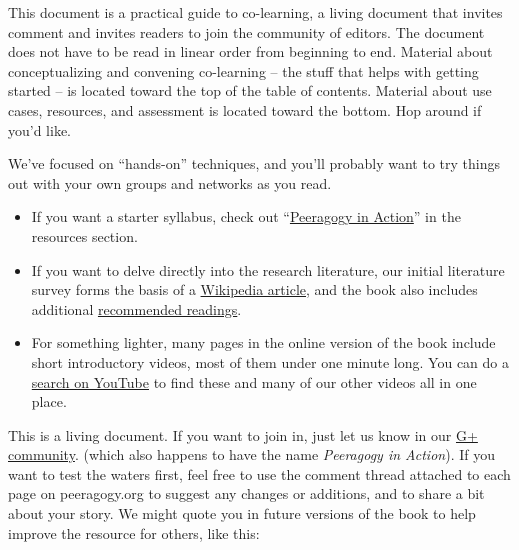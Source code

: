 This document is a practical guide to co-learning, a living document
that invites comment and invites readers to join the community of
editors. The document does not have to be read in linear order from
beginning to end. Material about conceptualizing and convening
co-learning -- the stuff that helps with getting started -- is located
toward the top of the table of contents. Material about use cases,
resources, and assessment is located toward the bottom. Hop around if
you'd like.

We've focused on ``hands-on'' techniques, and you'll probably want to
try things out with your own groups and networks as you read.

\begin{itemize}
\item
  If you want a starter syllabus, check out
  “\href{http://peeragogy.org/peeragogy-in-action/}{Peeragogy in
  Action}” in the resources section.
\item
  If you want to delve directly into the research literature, our
  initial literature survey forms the basis of a
  \href{https://en.wikipedia.org/wiki/Peer\_learning}{Wikipedia
  article}, and the book also includes additional
  \href{http://peeragogy.org/recommended-reading/}{recommended
  readings}.
\item
  For something lighter, many pages in the online version of the book
  include short introductory videos, most of them under one minute long.
  You can do a
  \href{http://www.youtube.com/results?search\_query=peeragogy\&sm=3}{search
  on YouTube} to find these and many of our other videos all in one
  place.
\end{itemize}
This is a living document. If you want to join in, just let us know in
our \href{https://plus.google.com/communities/107386162349686249470}{G+
community}. (which also happens to have the name \emph{Peeragogy in
Action}). If you want to test the waters first, feel free to use the
comment thread attached to each page on peeragogy.org to suggest any
changes or additions, and to share a bit about your story. We might
quote you in future versions of the book to help improve the resource
for others, like this:

